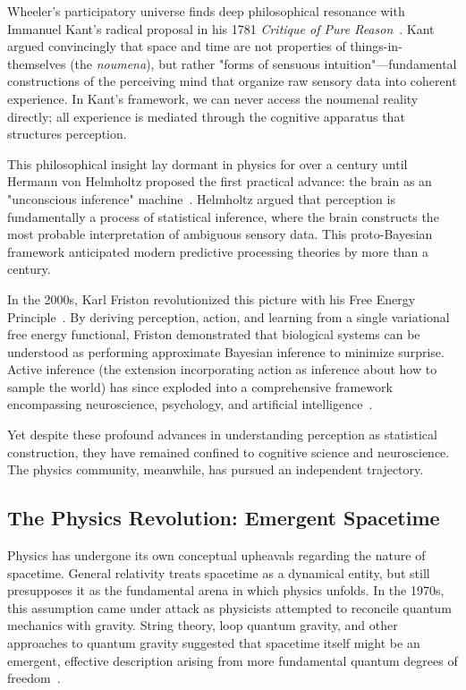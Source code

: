 \documentclass[11pt]{article}
\begin{document}
Wheeler's participatory universe finds deep philosophical resonance with Immanuel Kant's radical proposal in his 1781 \emph{Critique of Pure Reason}~\cite{Kant1781}. Kant argued convincingly that space and time are not properties of things-in-themselves (the \emph{noumena}), but rather "forms of sensuous intuition"---fundamental constructions of the perceiving mind that organize raw sensory data into coherent experience. In Kant's framework, we can never access the noumenal reality directly; all experience is mediated through the cognitive apparatus that structures perception.

This philosophical insight lay dormant in physics for over a century until Hermann von Helmholtz proposed the first practical advance: the brain as an "unconscious inference" machine~\cite{Helmholtz1867}. Helmholtz argued that perception is fundamentally a process of statistical inference, where the brain constructs the most probable interpretation of ambiguous sensory data. This proto-Bayesian framework anticipated modern predictive processing theories by more than a century.

In the 2000s, Karl Friston revolutionized this picture with his Free Energy Principle~\cite{Friston2010}. By deriving perception, action, and learning from a single variational free energy functional, Friston demonstrated that biological systems can be understood as performing approximate Bayesian inference to minimize surprise. Active inference (the extension incorporating action as inference about how to sample the world) has since exploded into a comprehensive framework encompassing neuroscience, psychology, and artificial intelligence~\cite{Parr2022}.

Yet despite these profound advances in understanding perception as statistical construction, they have remained confined to cognitive science and neuroscience. The physics community, meanwhile, has pursued an independent trajectory.

\subsection{The Physics Revolution: Emergent Spacetime}

Physics has undergone its own conceptual upheavals regarding the nature of spacetime. General relativity treats spacetime as a dynamical entity, but still presupposes it as the fundamental arena in which physics unfolds. In the 1970s, this assumption came under attack as physicists attempted to reconcile quantum mechanics with gravity. String theory, loop quantum gravity, and other approaches to quantum gravity suggested that spacetime itself might be an emergent, effective description arising from more fundamental quantum degrees of freedom~\cite{Carlip2014}.
\end{document}
